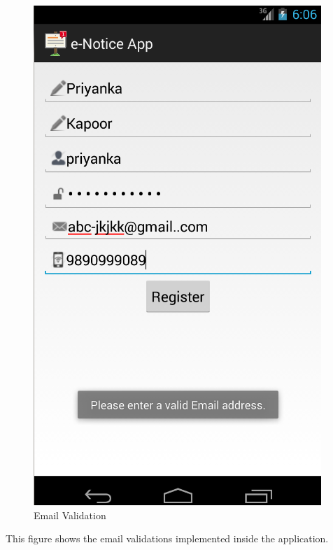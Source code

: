 \begin{figure}[H]
\centering \includegraphics[scale=0.7]{image/email.png}
\caption{Email Validation}
\end{figure}

This figure shows the email validations implemented inside the application.

